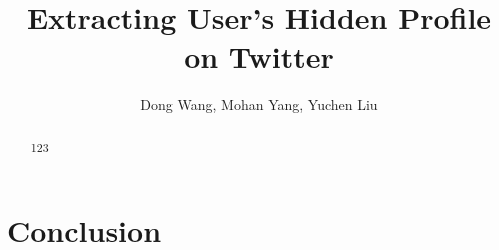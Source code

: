 \documentclass{sig-alternate}
\title{Extracting User's Hidden Profile on Twitter}
\author{Dong Wang, Mohan Yang, Yuchen Liu}
\begin{document}
\maketitle

\begin{abstract}
123
\end{abstract}









\section{Conclusion}\label{sec:conclusion}

{ }
\end{document}
